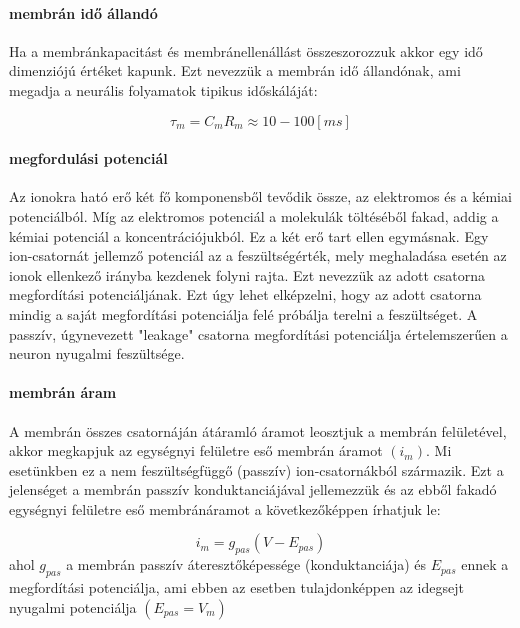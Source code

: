 \paragraph{membrán idő állandó}\label{par:tau}
Ha a membránkapacitást és membránellenállást összeszorozzuk akkor egy idő dimenziójú értéket kapunk. Ezt nevezzük a membrán idő állandónak, ami megadja a neurális folyamatok tipikus időskáláját:

\begin{equation}
	\tau_m = C_m R_m \approx 10-100 \left[ ms \right]
\end{equation}

\paragraph{megfordulási potenciál}
Az ionokra ható erő két fő komponensből tevődik össze, az elektromos és a kémiai potenciálból. Míg az elektromos potenciál a molekulák töltéséből fakad, addig a kémiai potenciál a koncentrációjukból. Ez a két erő tart ellen egymásnak. Egy ion-csatornát jellemző potenciál az a feszültségérték, mely meghaladása esetén az ionok ellenkező irányba kezdenek folyni rajta. Ezt nevezzük az adott csatorna megfordítási potenciáljának. Ezt úgy lehet elképzelni, hogy az adott csatorna mindig a saját megfordítási potenciálja felé próbálja terelni a feszültséget.
A passzív, úgynevezett "leakage" csatorna megfordítási potenciálja értelemszerűen a neuron nyugalmi feszültsége.

\paragraph{membrán áram}
A membrán összes csatornáján átáramló áramot leosztjuk a membrán felületével, akkor megkapjuk az egységnyi felületre eső membrán áramot $(i_m)$. Mi esetünkben ez a nem feszültségfüggő (passzív) ion-csatornákból származik. Ezt a jelenséget a membrán passzív konduktanciájával jellemezzük és az ebből fakadó egységnyi felületre eső membránáramot a következőképpen írhatjuk le:

\begin{equation}\label{eq:im}
	i_m = g_{pas}\left( V-E_{pas}\right)
\end{equation}
ahol $g_{pas}$ a membrán passzív áteresztőképessége (konduktanciája) és $E_{pas}$ ennek a megfordítási potenciálja, ami ebben az esetben tulajdonképpen az idegsejt nyugalmi potenciálja $(E_{pas} = V_{m})$



